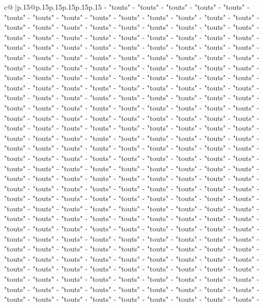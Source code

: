 \documentclass{article}
\begin{document}
{\begin{supertabular}{c@{$\;$}|p{.15\linewidth}@{}p{.15\linewidth}p{.15\linewidth}p{.15\linewidth}p{.15\linewidth}p{.15\linewidth}}
{{{{-} "touts" {-} "touts" {-} "touts" {-} "touts" {-} "touts" {-} "touts" {-} "touts" {-} "touts" {-} "touts" {-} "touts" {-} "touts" {-} "touts" {-} "touts" {-} "touts" {-} "touts" {-} "touts" {-} "touts" {-} "touts" {-} "touts" {-} "touts" {-} "touts" {-} "touts" {-} "touts" {-} "touts" {-} "touts" {-} "touts" {-} "touts" {-} "touts" {-} "touts" {-} "touts" {-} "touts" {-} "touts" {-} "touts" {-} "touts" {-} "touts" {-} "touts" {-} "touts" {-} "touts" {-} "touts" {-} "touts" {-} "touts" {-} "touts" {-} "touts" {-} "touts" {-} "touts" {-} "touts" {-} "touts" {-} "touts" {-} "touts" {-} "touts" {-} "touts" {-} "touts" {-} "touts" {-} "touts" {-} "touts" {-} "touts" {-} "touts" {-} "touts" {-} "touts" {-} "touts" {-} "touts" {-} "touts" {-} "touts" {-} "touts" {-} "touts" {-} "touts" {-} "touts" {-} "touts" {-} "touts" {-} "touts" {-} "touts" {-} "touts" {-} "touts" {-} "touts" {-} "touts" {-} "touts" {-} "touts" {-} "touts" {-} "touts" {-} "touts" {-} "touts" {-} "touts" {-} "touts" {-} "touts" {-} "touts" {-} "touts" {-} "touts" {-} "touts" {-} "touts" {-} "touts" {-} "touts" {-} "touts" {-} "touts" {-} "touts" {-} "touts" {-} "touts" {-} "touts" {-} "touts" {-} "touts" {-} "touts" {-} "touts" {-} "touts" {-} "touts" {-} "touts" {-} "touts" {-} "touts" {-} "touts" {-} "touts" {-} "touts" {-} "touts" {-} "touts" {-} "touts" {-} "touts" {-} "touts" {-} "touts" {-} "touts" {-} "touts" {-} "touts" {-} "touts" {-} "touts" {-} "touts" {-} "touts" {-} "touts" {-} "touts" {-} "touts" {-} "touts" {-} "touts" {-} "touts" {-} "touts" {-} "touts" {-} "touts" {-} "touts" {-} "touts" {-} "touts" {-} "touts" {-} "touts" {-} "touts" {-} "touts" {-} "touts" {-} "touts" {-} "touts" {-} "touts" {-} "touts" {-} "touts" {-} "touts" {-} "touts" {-} "touts" {-} "touts" {-} "touts" {-} "touts" {-} "touts" {-} "touts" {-} "touts" {-} "touts" {-} "touts" {-} "touts" {-} "touts" {-} "touts" {-} "touts" {-} "touts" {-} "touts" {-} "touts" {-} "touts" {-} "touts" {-} "touts" {-} "touts" {-} "touts" {-} "touts" {-} "touts" {-} "touts" {-} "touts" {-} "touts" {-} "touts" {-} "touts" {-} "touts" {-} "touts" {-} "touts" {-} "touts" {-} "touts" {-} "touts" {-} "touts" {-} "touts" {-} "touts" {-} "touts" {-} "touts" {-} "touts" {-} "touts" {-} "touts" {-} "touts" {-} "touts" {-} "touts" {-} "touts" {-} "touts" {-} "touts" {-} "touts" {-} "touts" {-} "touts" {-} "touts" {-} "touts" {-} "touts" {-} "touts" {-} "touts" {-} "touts" {-} "touts" {-} "touts" {-} "touts" {-} "touts" {-} "touts" {-} "touts" {-} "touts" {-} "touts" {-} "touts" {-} "touts" {-} "touts" {-} "touts" {-} "touts" {-} "touts" {-} "touts" {-} "touts" {-} "touts" {-} "touts" {-} "touts" {-} "touts" {-} "touts" {-} "touts" {-} "touts" {-} "touts" {-} "touts" {-} "touts" {-} "touts" {-} "touts" {-} "touts" {-} "touts" {-} "touts" {-} "touts" {-} "touts" {-} "touts" {-} "touts" {-} "touts" {-} "touts" {-} "touts" {-} "touts" {-} "touts" {-} "touts" {-} "touts" {-} "touts" {-} "touts" {-} "touts" {-} "touts" {-} "touts" {-} "touts" {-} "touts" {-} "touts" {-} "touts" {-} "touts" {-} "touts" {-} "touts" {-} "touts" {-} "touts" {-} "touts" {-} "touts" {-} "touts" {-} "touts" {-} "touts" {-} "touts" {-} "touts" {-} }}}
\end{supertabular}}
\end{document}
